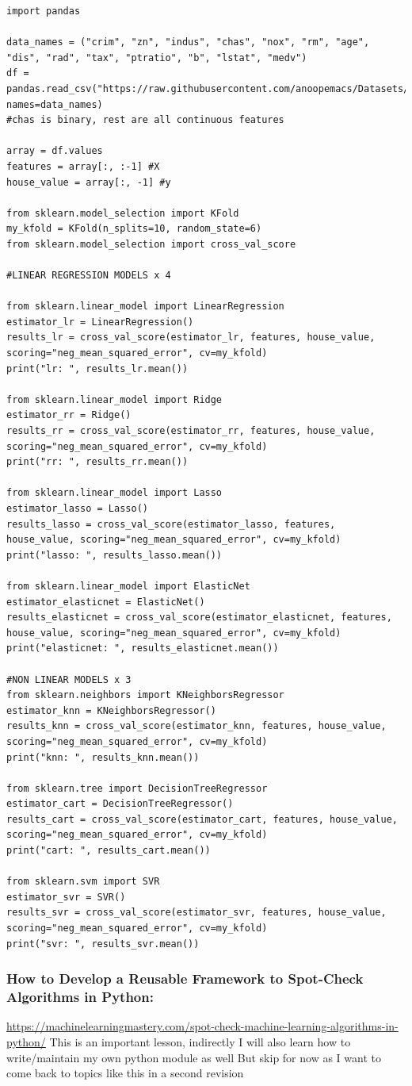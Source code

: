 \documentclass[11pt]{article}
\begin{document}
\begin{verbatim}
import pandas

data_names = ("crim", "zn", "indus", "chas", "nox", "rm", "age", "dis", "rad", "tax", "ptratio", "b", "lstat", "medv")
df = pandas.read_csv("https://raw.githubusercontent.com/anoopemacs/Datasets/master/housing.csv", names=data_names)
#chas is binary, rest are all continuous features

array = df.values
features = array[:, :-1] #X
house_value = array[:, -1] #y

from sklearn.model_selection import KFold
my_kfold = KFold(n_splits=10, random_state=6)
from sklearn.model_selection import cross_val_score

#LINEAR REGRESSION MODELS x 4

from sklearn.linear_model import LinearRegression
estimator_lr = LinearRegression()
results_lr = cross_val_score(estimator_lr, features, house_value, scoring="neg_mean_squared_error", cv=my_kfold)
print("lr: ", results_lr.mean())

from sklearn.linear_model import Ridge
estimator_rr = Ridge()
results_rr = cross_val_score(estimator_rr, features, house_value, scoring="neg_mean_squared_error", cv=my_kfold)
print("rr: ", results_rr.mean())

from sklearn.linear_model import Lasso
estimator_lasso = Lasso()
results_lasso = cross_val_score(estimator_lasso, features, house_value, scoring="neg_mean_squared_error", cv=my_kfold)
print("lasso: ", results_lasso.mean())

from sklearn.linear_model import ElasticNet
estimator_elasticnet = ElasticNet()
results_elasticnet = cross_val_score(estimator_elasticnet, features, house_value, scoring="neg_mean_squared_error", cv=my_kfold)
print("elasticnet: ", results_elasticnet.mean())

#NON LINEAR MODELS x 3
from sklearn.neighbors import KNeighborsRegressor
estimator_knn = KNeighborsRegressor()
results_knn = cross_val_score(estimator_knn, features, house_value, scoring="neg_mean_squared_error", cv=my_kfold)
print("knn: ", results_knn.mean())

from sklearn.tree import DecisionTreeRegressor
estimator_cart = DecisionTreeRegressor()
results_cart = cross_val_score(estimator_cart, features, house_value, scoring="neg_mean_squared_error", cv=my_kfold)
print("cart: ", results_cart.mean())

from sklearn.svm import SVR
estimator_svr = SVR()
results_svr = cross_val_score(estimator_svr, features, house_value, scoring="neg_mean_squared_error", cv=my_kfold)
print("svr: ", results_svr.mean())
\end{verbatim}
\subsubsection{How to Develop a Reusable Framework to Spot-Check Algorithms in Python:}
\label{sec:org20123d9}
\url{https://machinelearningmastery.com/spot-check-machine-learning-algorithms-in-python/}
This is an important lesson, indirectly I will also learn how to write/maintain my own python module as well
But skip for now as I want to come back to topics like this in a second revision
\end{document}
